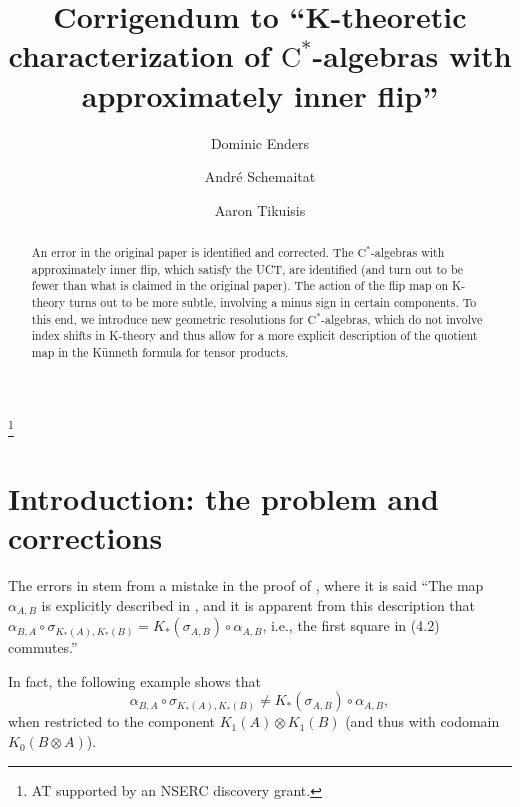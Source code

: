 \documentclass[a4paper,10pt]{amsart}
\newcommand{\cstar}{\ensuremath{\mathrm C^\ast}}
\numberwithin{equation}{section}
\numberwithin{theorem}{section}
\begin{document}
\title[Corrigendum: approximately inner flip]{Corrigendum to ``K-theoretic characterization of $\cstar$-algebras with approximately inner flip''}
\author[D.\ Enders]{Dominic Enders}
\author[A.\ Schemaitat]{Andr\'e Schemaitat}
\author[A.\ Tikuisis]{Aaron Tikuisis}
\thanks{AT supported by an NSERC discovery grant.}

\begin{abstract}
An error in the original paper is identified and corrected. The \cstar-algebras with approximately inner flip, which satisfy the UCT, are identified (and turn out to be fewer than what is claimed in the original paper). The action of the flip map on K-theory turns out to be more subtle, involving a minus sign in certain components. To this end, we introduce new geometric resolutions for \cstar-algebras, which do not involve index shifts in K-theory and thus allow for a more explicit description of the quotient map in the K\"unneth formula for tensor products.
\end{abstract}

\maketitle

\section{Introduction: the problem and corrections}

The errors in \cite{aifK} stem from a mistake in the proof of \cite[Lemma 4.1]{aifK}, where it is said ``The map $\alpha_{A,B}$ is explicitly described in \cite[Section 23.1]{Blackadar:KBook}, and it is apparent from this description that $\alpha_{B,A} \circ \sigma_{K_\ast(A),K_\ast(B)} = K_\ast(\sigma_{A,B}) \circ \alpha_{A,B}$, i.e., the first square in (4.2) commutes.''

In fact, the following example shows that 
\[ \alpha_{B,A} \circ \sigma_{K_*(A),K_*(B)} \neq K_*(\sigma_{A,B}) \circ \alpha_{A,B}, \]
when restricted to the component $K_1(A) \otimes K_1(B)$ (and thus with codomain $K_0(B \otimes A)$).
\end{document}
